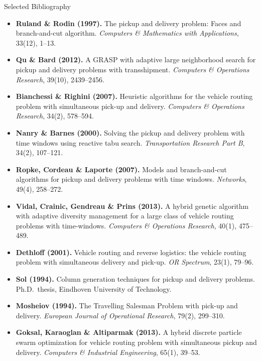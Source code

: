 \documentclass[aspectratio=169,10pt]{beamer}
\begin{document}
\begin{frame}[allowframebreaks]{Selected Bibliography}
\begin{itemize}
    \item \textbf{Ruland \& Rodin (1997).} The pickup and delivery problem:
          Faces and branch-and-cut algorithm.
          \textit{Computers \& Mathematics with Applications}, 33(12), 1--13.

    \item \textbf{Qu \& Bard (2012).} A GRASP with adaptive large neighborhood search
          for pickup and delivery problems with transshipment.
          \textit{Computers \& Operations Research}, 39(10), 2439--2456.

    \item \textbf{Bianchessi \& Righini (2007).} Heuristic algorithms for the vehicle
          routing problem with simultaneous pick-up and delivery.
          \textit{Computers \& Operations Research}, 34(2), 578--594.

    \item \textbf{Nanry \& Barnes (2000).} Solving the pickup and delivery problem with
          time windows using reactive tabu search.
          \textit{Transportation Research Part B}, 34(2), 107--121.

    \item \textbf{Ropke, Cordeau \& Laporte (2007).} Models and branch-and-cut algorithms
          for pickup and delivery problems with time windows.
          \textit{Networks}, 49(4), 258--272.

    \item \textbf{Vidal, Crainic, Gendreau \& Prins (2013).} A hybrid genetic algorithm
          with adaptive diversity management for a large class of vehicle routing problems
          with time-windows. \textit{Computers \& Operations Research}, 40(1), 475--489.

    \item \textbf{Dethloff (2001).} Vehicle routing and reverse logistics: the vehicle
          routing problem with simultaneous delivery and pick-up.
          \textit{OR Spectrum}, 23(1), 79--96.

    \item \textbf{Sol (1994).} Column generation techniques for pickup and delivery
          problems. Ph.D.\ thesis, Eindhoven University of Technology.

    \item \textbf{Mosheiov (1994).} The Travelling Salesman Problem with pick-up and
          delivery. \textit{European Journal of Operational Research}, 79(2), 299--310.

    \item \textbf{Goksal, Karaoglan \& Altiparmak (2013).} A hybrid discrete particle
          swarm optimization for vehicle routing problem with simultaneous pickup and
          delivery. \textit{Computers \& Industrial Engineering}, 65(1), 39--53.


\end{itemize}
\end{frame}
\end{document}
